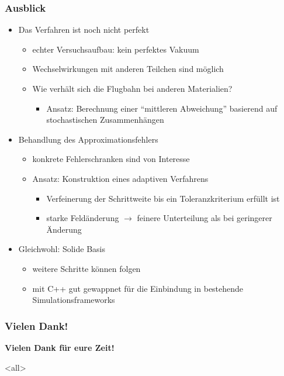 \mode*

\begin{frame}
  \frametitle{Ausblick}
  \begin{itemize}
    \item Das Verfahren ist noch nicht perfekt
      \begin{itemize}
        \item echter Versuchsaufbau: kein perfektes Vakuum
        \item Wechselwirkungen mit anderen Teilchen sind m\"oglich
        \item Wie verh\"alt sich die Flugbahn bei anderen Materialien?
          \begin{itemize}
            \item Ansatz: Berechnung einer "`mittleren Abweichung"' basierend auf stochastischen Zusammenh\"angen
          \end{itemize}
      \end{itemize}
    \item Behandlung des Approximationsfehlers
      \begin{itemize}
        \item konkrete Fehlerschranken sind von Interesse
        \item Ansatz: Konstruktion eines adaptiven Verfahrens
          \begin{itemize}
            \item Verfeinerung der Schrittweite bis ein Toleranzkriterium erf\"ullt ist
            \item starke Feld\"anderung \(\rightarrow\) feinere Unterteilung als bei geringerer \"Anderung
          \end{itemize}
      \end{itemize}
    \item Gleichwohl: Solide Basis
      \begin{itemize}
        \item weitere Schritte k\"onnen folgen
        \item mit C++ gut gewappnet f\"ur die Einbindung in bestehende Simulationsframeworks
      \end{itemize}
  \end{itemize}
\end{frame}

\begin{frame}
  \frametitle{Vielen Dank!}
  \centering
  \textbf{Vielen Dank f\"ur eure Zeit!}
\end{frame}

\mode<all>
